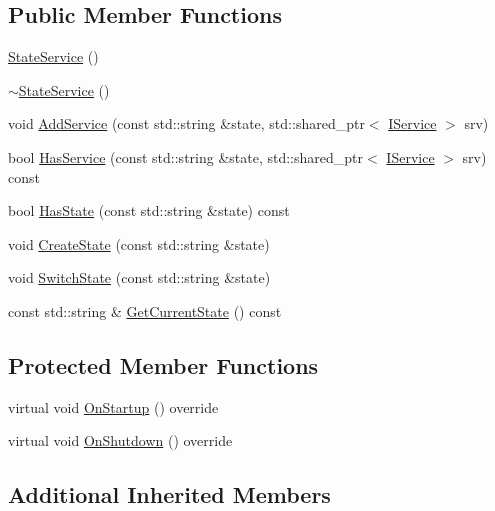 \subsection*{Public Member Functions}
\begin{DoxyCompactItemize}
\item 
\hyperlink{classastu_1_1StateService_ae8be300ce5fd92351d52fc7162ce9793}{State\+Service} ()
\item 
\hyperlink{classastu_1_1StateService_a27bbe3ef0f9a4600c559ca9f6def3f5f}{$\sim$\+State\+Service} ()
\item 
void \hyperlink{classastu_1_1StateService_a5b6125be259b52bf9f3e80453def9e21}{Add\+Service} (const std\+::string \&state, std\+::shared\+\_\+ptr$<$ \hyperlink{classastu_1_1IService}{I\+Service} $>$ srv)
\item 
bool \hyperlink{classastu_1_1StateService_a611255de384fd0e53fccf30cb53662b6}{Has\+Service} (const std\+::string \&state, std\+::shared\+\_\+ptr$<$ \hyperlink{classastu_1_1IService}{I\+Service} $>$ srv) const
\item 
bool \hyperlink{classastu_1_1StateService_adfd94f9b5d622131a1fdcc4dcf5ef51d}{Has\+State} (const std\+::string \&state) const
\item 
void \hyperlink{classastu_1_1StateService_ae1916f97f8f386b6f4ac42d58c0ae97f}{Create\+State} (const std\+::string \&state)
\item 
void \hyperlink{classastu_1_1StateService_a3396bad71a626dd749295375759015d3}{Switch\+State} (const std\+::string \&state)
\item 
const std\+::string \& \hyperlink{classastu_1_1StateService_ac643aebb1bfe9880db1bac7533e0ec75}{Get\+Current\+State} () const
\end{DoxyCompactItemize}
\subsection*{Protected Member Functions}
\begin{DoxyCompactItemize}
\item 
virtual void \hyperlink{classastu_1_1StateService_a06419feca958b72db99dde6eda301f86}{On\+Startup} () override
\item 
virtual void \hyperlink{classastu_1_1StateService_ad8fa5b6d52bd795ebba450f119540d87}{On\+Shutdown} () override
\end{DoxyCompactItemize}
\subsection*{Additional Inherited Members}


